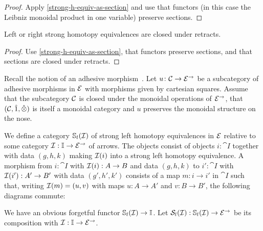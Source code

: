 \documentclass[reqno,10pt,a4paper,oneside]{amsart}
\begin{document}
\begin{proof}
Apply \cref{strong-h-equiv-as-section} and use that functors (in this case the Leibniz monoidal product in one variable) preserve sections.
\end{proof}

\begin{proposition}
\label{strong-h-equiv-closed-under-retract}
Left or right strong homotopy equivalences are closed under retracts.
\end{proposition}

\begin{proof}
Use \cref{strong-h-equiv-as-section},  that functors preserve sections, and that  sections are closed under retracts.
\end{proof}






Recall the notion of an adhesive morphism~\cite{garner-lack:adhesive}.  Let $u \co \cal{C} \to \catE^{\to}$ be a subcategory of adhesive morphisms in $\catE$ with morphisms given by cartesian squares. Assume that the subcategory $\cal{C}$ is closed under the monoidal operations of $\catE^{\to}$, \ie that $(\cal{C}, \hatunit, \hatotimes)$ is itself a monoidal category and $u$ preserves the monoidal structure on the nose. 

\newpage


\begin{definition}
We define a category $\cat{S}_l(\cal{I})$ of strong left homotopy equivalences in $\catE$ relative to some category $\cal{I} : \cat{I} \to \catE^{\to}$ of arrows.
The objects consist of objects $i : \cat{I}$ together with data $(g, h, k)$ making $\cal{I}(i)$ into a strong left homotopy equivalence.
A morphism from $i : \cat{I}$ with $\cal{I}(i) : A \to B$ and data $(g, h, k)$ to $i' : \cat{I}$ with $\cal{I}(i') : A' \to B'$ with data $(g', h', k')$ consists of a map $m : i \to i'$ in $\cat{I}$ such that, writing $\cal{I}(m) = (u, v)$ with maps $u : A \to A'$ and $v : B \to B'$, the following diagrams commute:

We have an obvious forgetful functor $\cat{S}_l(\cal{I}) \to \cat{I}$.
Let $\cal{S}_l(\cal{I}) : \cat{S}_l(\cal{I}) \to \catE^{\to}$ be its composition with $\cal{I} : \cat{I} \to \catE^{\to}$.
\end{definition}
\end{document}
